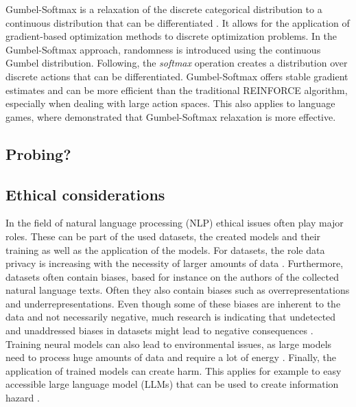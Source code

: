 Gumbel-Softmax is a relaxation of the discrete categorical distribution to a continuous distribution that can be differentiated \citep{Jang2017}.
It allows for the application of gradient-based optimization methods to discrete optimization problems.
In the Gumbel-Softmax approach, randomness is introduced using the continuous Gumbel distribution.
Following, the \emph{softmax} operation creates a distribution over discrete actions that can be differentiated.
Gumbel-Softmax offers stable gradient estimates and can be more efficient than the traditional REINFORCE algorithm, especially when dealing with large action spaces.
This also applies to language games, where \citet{Havrylov2017} demonstrated that Gumbel-Softmax relaxation is more effective.

\subsection{Probing?}

\subsection{Ethical considerations}
In the field of natural language processing (NLP) ethical issues often play major roles.
These can be part of the used datasets, the created models and their training as well as the application of the models.
For datasets, the role data privacy is increasing with the necessity of larger amounts of data \citep{Klymenko2022}.
Furthermore, datasets often contain biases, based for instance on the authors of the collected natural language texts. Often they also contain biases such as overrepresentations and underrepresentations.
Even though some of these biases are inherent to the data and not necessarily negative, much research is indicating that undetected and unaddressed biases in datasets might lead to negative consequences \citep{Shah2020,Field2021,Bender2021}.
Training neural models can also lead to environmental issues, as large models need to process huge amounts of data and require a lot of energy \citep{Bender2021}.
Finally, the application of trained models can create harm.
This applies for example to easy accessible large language model (LLMs) that can be used to create information hazard \citep{Weidinger2022}.

